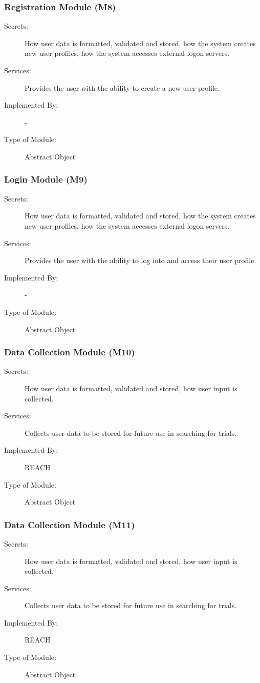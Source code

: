 \documentclass[12pt, titlepage]{article}
\begin{document}
\subsubsection{Registration Module (M8)}
\begin{description}
\item[Secrets:] How user data is formatted, validated and stored, how the system creates new user profiles, how the system accesses external logon servers.
\item[Services:] Provides the user with the ability to create a new user profile.
\item[Implemented By:] -
\item[Type of Module:] Abstract Object \\
\end{description}

\subsubsection{Login Module (M9)}
\begin{description}
\item[Secrets:] How user data is formatted, validated and stored, how the system creates new user profiles, how the system accesses external logon servers.
\item[Services:] Provides the user with the ability to log into and access their user profile.
\item[Implemented By:] -
\item[Type of Module:] Abstract Object \\
\end{description}

\subsubsection{Data Collection Module (M10)}
\begin{description}
\item[Secrets:] How user data is formatted, validated and stored, how user input is collected.
\item[Services:] Collects user data to be stored for future use in searching for trials.
\item[Implemented By:] REACH
\item[Type of Module:] Abstract Object \\
\end{description}

\subsubsection{Data Collection Module (M11)}
\begin{description}
\item[Secrets:] How user data is formatted, validated and stored, how user input is collected.
\item[Services:] Collects user data to be stored for future use in searching for trials.
\item[Implemented By:] REACH
\item[Type of Module:] Abstract Object \\
\end{description}
\end{document}
